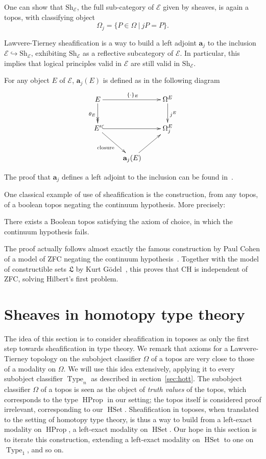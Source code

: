 \documentclass[notfinal]{jfrarticle}
\DeclareMathOperator{\Type}{Type}
\DeclareMathOperator{\HProp}{HProp}
\DeclareMathOperator{\HSet}{HSet}
\newcommand \Sh[1] {\mathrm{Sh}_{#1}}
\begin{document}
One can show that $\Sh{\mathcal E}$, the full sub-category of
$\mathcal E$ given by
sheaves, is again a topos, with classifying object
%
\[
\Omega_j = \{ P \in \Omega \ | \ j P  = P \}.
\]

Lawvere-Tierney sheafification is a way to build a left adjoint $\mathbf{a}_j$ to the
inclusion $\mathcal E \hookrightarrow \Sh{\mathcal E}$, exhibiting
$\Sh{\mathcal E}$ as a reflective subcategory of $\mathcal E$. In
particular, this implies that logical principles valid in $\mathcal E$
are still valid in $\Sh{\mathcal E}$.

For any object $E$ of $\mathcal E$, $\mathbf{a}_j(E)$ is defined as in
the following diagram
\[
  \xymatrix{ 
    E \ar[rr]^{\{\cdot\}_E} \ar@{->>}[d]_{\theta_E} && \Omega^E \ar[d]^{j^E}\\
    E' \ar@{^{(}->}[rr] \ar[dr]_{\text{closure}} && \Omega_j^E \\
    & \mathbf{a}_j(E) \ar[ur]&
  }
\]

The proof that $\mathbf a_j$ defines a left adjoint to the inclusion
can be found in~\cite{maclanemoerdijk}.

One classical example of use of sheafification is the construction,
from any topos, of a boolean topos negating the continuum
hypothesis. More precisely:

\begin{thm}
  There exists a Boolean topos satisfying the axiom of choice, in
  which the continuum hypothesis fails.
\end{thm}

The proof actually follows almost exactly the famous construction by
Paul Cohen of a model of ZFC negating the continuum
hypothesis~\cite{cohen1966}. Together with the model of constructible
sets $\mathfrak L$ by Kurt Gödel~\cite{godel40}, this proves that CH is
independent of ZFC, solving Hilbert's first problem.

\section{Sheaves in homotopy type theory}
\label{sec:sheaf_hott}

The idea of this section is to consider sheafification in toposes as
only the first step towards sheafification in type theory.  We remark
that axioms for a Lawvere-Tierney topology on the subobject classifier
$\Omega$ of a topos are very close to those of a modality on
$\Omega$. We will use this idea extensively, applying it to every
subobject classifier $\Type_n$ as described in
section~\ref{sec:hott}. The subobject classifier $\Omega$ of a topos
is seen as the object of {\em truth values} of the topos, which
corresponds to the type $\HProp$ in our setting; the topos itself is
considered proof irrelevant, corresponding to our
$\HSet$. Sheafification in toposes, when translated to
the setting of homotopy type theory, is thus a way to build from a left-exact
modality on $\HProp$, a left-exact modality on $\HSet$. Our hope in
this section is to iterate this construction, extending a left-exact
modality on $\HSet$ to one on $\Type_1$, and so on.
\end{document}
